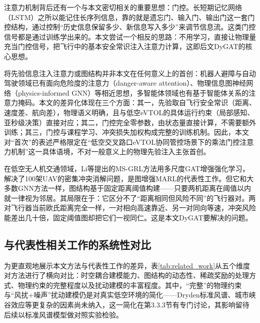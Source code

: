 \documentclass[12pt,a4paper,UTF8]{ctexart}
\begin{document}
注意力机制背后还有一个与本文密切相关的重要思想：门控。长短期记忆网络（LSTM）\cite{ref37}之所以能记住长序列信息，靠的就是遗忘门、输入门、输出门这一套门控结构，通过控制“历史信息保留多少、新信息写入多少”来调节信息流。这类门控信号都是通过训练学出来的。本文尝试一个相反的思路：不用学习，直接让物理量充当门控信号，把飞行中的基本安全常识注入注意力计算，这即后文DyGAT的核心思想。

将先验信息注入注意力或图结构并非本文在任何意义上的首创：机器人避障与自动驾驶领域已有面向危险度的注意力（danger-aware attention）、物理信息图神经网络（physics-informed GNN）等相近思想\cite{ref55}，多智能体领域也有基于智能体关系的注意力掩码。本文的差异化体现在三个方面：其一，先验取自飞行安全常识（距离、速度差、航向差），物理语义明确，且与低空eVTOL的具体运行约束（局部感知、亚秒级决策）直接对应；其二，门控完全零参数，由状态量直接计算，不需要额外训练；其三，门控与课程学习、冲突损失加权构成完整的训练机制。因此，本文对“首次”的表述严格限定在“低空交叉路口eVTOL协同管控场景下的乘法门控注意力机制”这一具体语境，不对一般意义上的物理先验注入主张首创。

在低空无人机交通领域，Li等\cite{ref10}提出的MS-GRL方法用多尺度GAT增强强化学习，解决了100架UAV的密集冲突消解问题，是图增强MARL的代表性工作。但它和大多数GNN方法一样，图结构基于固定距离阈值构建——只要两机距离在阈值以内就一律视为邻居。其局限在于：它区分不了“距离相同但风险不同”的飞行器对。两对飞行器当前欧氏距离完全一样，一对相向高速靠近、另一对同向等速，冲突风险能差出几十倍，固定阈值图却把它们一视同仁。这是本文DyGAT要解决的问题。

\subsection{与代表性相关工作的系统性对比}

为更直观地展示本文方法与代表性工作的差异，表\ref{tab:related_work}从五个维度对方法进行了横向对比：时空耦合建模能力、图结构的动态性、稀疏奖励的处理方式、物理约束的完整程度以及扰动建模的丰富程度。其中，“完整”的物理约束与“风扰+噪声”扰动建模仍是对真实低空环境的简化——Dryden标准风谱、城市峡谷效应等更复杂的因素尚未纳入，这一简化在第3.3.3节有专门讨论，其影响留待后续以标准风谱模型做对照实验检验。
\end{document}
